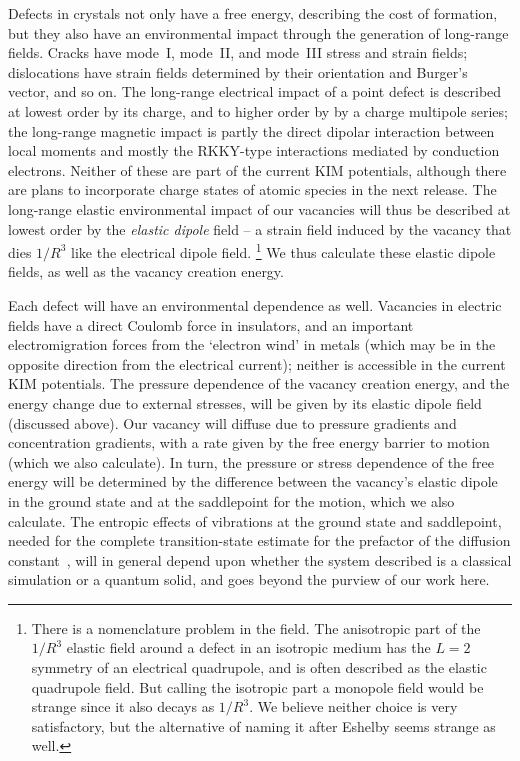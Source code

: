 \documentclass[%
 reprint,
 nofootinbib,
 amsmath,amssymb,
 aps,
]{revtex4-1}
\begin{document}
Defects in crystals not only have a free energy, describing the cost of formation, but they also have an environmental impact through the generation of long-range fields.
Cracks have mode~I, mode~II, and mode~III stress and strain fields; dislocations have strain fields determined by their orientation and Burger's vector, and so on.
The long-range electrical impact of a point defect is described at lowest order by its charge, and to higher order by by a charge multipole series;
the long-range magnetic impact is partly the direct dipolar interaction between local moments and mostly the RKKY-type interactions mediated by conduction electrons.
Neither of these are part of the current KIM potentials, although there are plans to incorporate charge states of atomic species in the next release.
The long-range elastic environmental impact of our vacancies will thus be described at lowest order by the {\em elastic dipole} field -- a strain field induced by the vacancy that dies $1/R^3$ like the electrical dipole field.%
\footnote{
There is a nomenclature problem in the field.
The anisotropic part of the $1/R^3$ elastic field around a defect in an isotropic medium has the $L=2$ symmetry of an electrical quadrupole, and is often described as the elastic quadrupole field.
But calling the isotropic part a monopole field would be strange since it also decays as $1/R^3$.
We believe neither choice is very satisfactory, but the alternative of naming it after Eshelby seems strange as well.
}
We thus calculate these elastic dipole fields, as well as the vacancy creation energy.

Each defect will have an environmental dependence as well.
Vacancies in electric fields have a direct Coulomb force in insulators, and an important electromigration forces from the `electron wind' in metals (which may be in the opposite direction from the electrical current); neither is accessible in the current KIM potentials.
The pressure dependence of the vacancy creation energy, and the energy change due to external stresses, will be given by its elastic dipole field (discussed above).
Our vacancy will diffuse due to pressure gradients and concentration gradients, with a rate given by the free energy barrier to motion (which we also calculate).
In turn, the pressure or stress dependence of the free energy will be determined by the difference between the vacancy's elastic dipole in the ground state and at the saddlepoint for the motion, which we also calculate.
The entropic effects of vibrations at the ground state and saddlepoint, needed for the complete transition-state estimate for the prefactor of the diffusion constant~\cite{burada2009diffusion}, will in general depend upon whether the system described is a classical simulation or a quantum solid, and goes beyond the purview of our work here.
\end{document}
